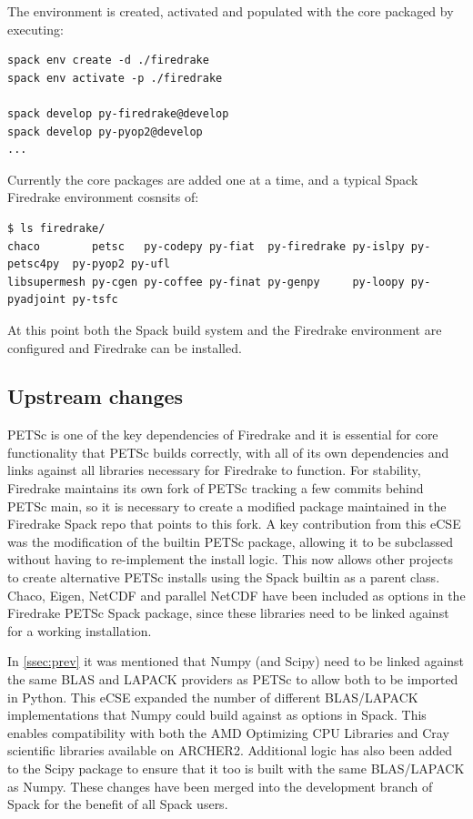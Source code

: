 \documentclass[a4paper,11pt]{article}
\begin{document}
The environment is created, activated and populated with the core packaged by executing:
\begin{lstlisting}
spack env create -d ./firedrake
spack env activate -p ./firedrake

spack develop py-firedrake@develop
spack develop py-pyop2@develop
...
\end{lstlisting}

Currently the core packages are added one at a time, and a typical Spack Firedrake environment cosnsits of:
\begin{lstlisting}
$ ls firedrake/
chaco        petsc   py-codepy py-fiat  py-firedrake py-islpy py-petsc4py  py-pyop2 py-ufl
libsupermesh py-cgen py-coffee py-finat py-genpy     py-loopy py-pyadjoint py-tsfc
\end{lstlisting}

At this point both the Spack build system and the Firedrake environment are configured and Firedrake can be installed.


\subsection{Upstream changes}
\label{ssec:changes}
PETSc is one of the key dependencies of Firedrake and it is essential for core functionality that PETSc builds correctly, with all of its own dependencies and links against all libraries necessary for Firedrake to function.
For stability, Firedrake maintains its own fork of PETSc tracking a few commits behind PETSc main, so it is necessary to create a modified package maintained in the Firedrake Spack repo that points to this fork.
A key contribution from this eCSE was the modification of the builtin PETSc package, allowing it to be subclassed without having to re-implement the install logic.
This now allows other projects to create alternative PETSc installs using the Spack builtin as a parent class.
Chaco, Eigen, NetCDF and parallel NetCDF have been included as options in the Firedrake PETSc Spack package, since these libraries need to be linked against for a working installation.

In \cref{ssec:prev} it was mentioned that Numpy (and Scipy) need to be linked against the same BLAS and LAPACK providers as PETSc to allow both to be imported in Python.
This eCSE expanded the number of different BLAS/LAPACK implementations that Numpy could build against as options in Spack.
This enables compatibility with both the AMD Optimizing CPU Libraries and Cray scientific libraries available on ARCHER2.
Additional logic has also been added to the Scipy package to ensure that it too is built with the same BLAS/LAPACK as Numpy.
These changes have been merged into the development branch of Spack for the benefit of all Spack users.
\end{document}
